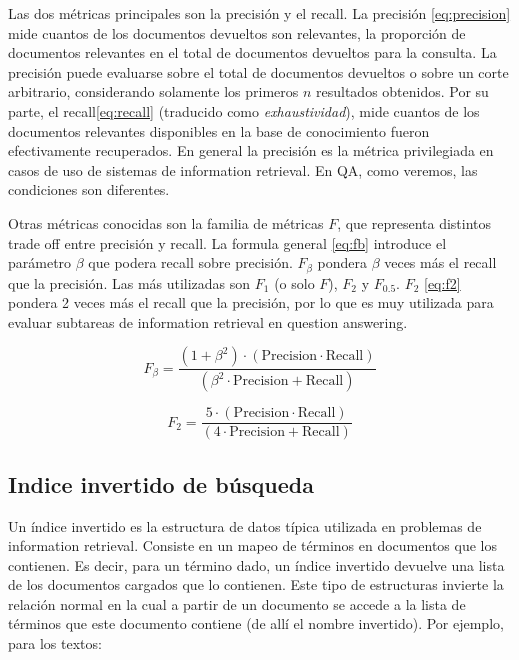 \medskip 

Las dos métricas principales son la precisión y el recall.
La precisión \eqref{eq:precision} mide cuantos de los documentos devueltos son relevantes, la proporción de documentos relevantes en el total de documentos devueltos para la consulta. La precisión puede evaluarse sobre el total de documentos devueltos o sobre un corte arbitrario, considerando solamente los primeros $n$  resultados obtenidos. Por su parte, el recall\eqref{eq:recall} (traducido como \textit{exhaustividad}), mide cuantos de los documentos relevantes disponibles en la base de conocimiento fueron efectivamente recuperados. En general la precisión es la métrica privilegiada en casos de uso de sistemas de information retrieval. En QA, como veremos, las condiciones son diferentes.



Otras métricas conocidas son la familia de métricas $F$, que representa distintos trade off entre precisión y recall.
La formula general \eqref{eq:fb} introduce el parámetro $\beta$ que podera recall sobre precisión. $F_\beta$ pondera $\beta$ veces más el recall que la precisión. Las más utilizadas son $F_1$ (o solo $F$), $F_2$ y $F_{0.5}$. $F_2$ \eqref{eq:f2} pondera 2 veces más el recall que la precisión, por lo que es muy utilizada para evaluar subtareas de information retrieval en question answering.

\begin{equation}\label{eq:fb}
  F_\beta = \frac{(1 + \beta^2) \cdot (\mathrm{Precision} \cdot \mathrm{Recall})}{(\beta^2 \cdot \mathrm{Precision} + \mathrm{Recall})}
\end{equation}


\begin{equation}\label{eq:f2}
  F_2 = \frac{5 \cdot (\mathrm{Precision} \cdot \mathrm{Recall})}{(4 \cdot \mathrm{Precision} + \mathrm{Recall})}
\end{equation}


\subsection{Indice invertido de búsqueda}
Un índice invertido es la estructura de datos típica utilizada en problemas de information retrieval. Consiste en un mapeo de términos en documentos que los contienen. Es decir, para un término dado, un índice invertido devuelve una lista de los documentos cargados que lo contienen. Este tipo de estructuras invierte la relación normal en la cual a partir de un documento se accede a la lista de términos que este documento contiene (de allí el nombre invertido).
Por ejemplo, para los textos:
\medskip

